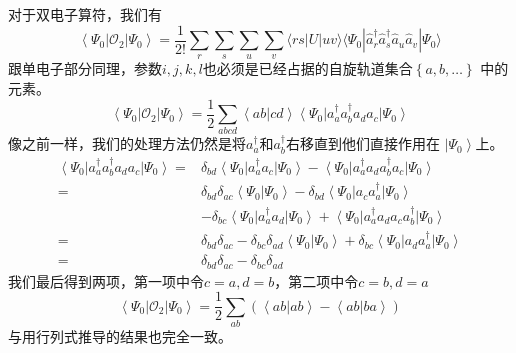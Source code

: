 \documentclass[12pt,a4paper,openany,twoside]{book}
\numberwithin{equation}{section}
\begin{document}
      对于双电子算符，我们有
      \begin{equation}
          \left\langle \Psi_0\right|\mathcal{O}_2\left|\Psi_0\right\rangle=\frac{1}{2!} \sum_{r} \sum_{s} \sum_{u} \sum_{v}\langle r s|U| u v\rangle \langle \Psi_0|\hat{a}_{r}^{\dagger} \hat{a}_{s}^{\dagger} \hat{a}_{u} \hat{a}_{v}|\Psi_0\rangle
      \end{equation}
      跟单电子部分同理，参数$i,j,k,l$也必须是已经占据的自旋轨道集合$\left\{a,b,\ldots\right\}$
      中的元素。
      \begin{equation}
          \left\langle \Psi_0\right|\mathcal{O}_2\left|\Psi_0\right\rangle=
          \frac{1}{2}\sum_{abcd}\left\langle ab\right.\left|cd\right\rangle
          \left\langle \Psi_0\right|a_a^\dagger a_b^\dagger a_d a_c \left|\Psi_0\right\rangle
      \end{equation}
      像之前一样，我们的处理方法仍然是将$a_a^\dagger$和$a_b^\dagger$右移直到他们直接作用在
      $\left|\Psi_0\right\rangle$上。
      \begin{equation}
          \begin{aligned}
              \left\langle \Psi_0\right|a_a^\dagger a_b^\dagger a_d a_c \left|\Psi_0\right\rangle
              =&\delta_{bd}\left\langle\Psi_0\right|a_a^\dagger a_c\left|\Psi_0\right\rangle-
              \left\langle \Psi_0\right|a_a^\dagger a_d a_b^\dagger a_c \left|\Psi_0\right\rangle\\
              =&\delta_{bd}\delta_{ac}\left\langle\Psi_0\right.\left|\Psi_0\right\rangle-
              \delta_{bd}\left\langle\Psi_0\right|a_c a_a^\dagger\left|\Psi_0\right\rangle\\
              &-\delta_{bc}\left\langle\Psi_0\right|a_a^\dagger a_d\left|\Psi_0\right\rangle
              +\left\langle \Psi_0\right|a_a^\dagger a_d a_c a_b^\dagger \left|\Psi_0\right\rangle\\
              =&\delta_{bd}\delta_{ac}-\delta_{bc}\delta_{ad}\left\langle\Psi_0\right.\left|\Psi_0\right\rangle+
              \delta_{bc}\left\langle\Psi_0\right|a_d a_a^\dagger\left|\Psi_0\right\rangle\\
              =&\delta_{bd}\delta_{ac}-\delta_{bc}\delta_{ad}
          \end{aligned}
      \end{equation}
      我们最后得到两项，第一项中令$c=a,d=b$，第二项中令$c=b,d=a$
      \begin{equation}
          \left\langle \Psi_0\right|\mathcal{O}_2\left|\Psi_0\right\rangle=
          \frac{1}{2}\sum_{ab}\left(\left\langle ab\right.\left|ab\right\rangle-
          \left\langle ab\right.\left|ba\right\rangle\right)
      \end{equation}
      与用行列式推导的结果也完全一致。
\end{document}
